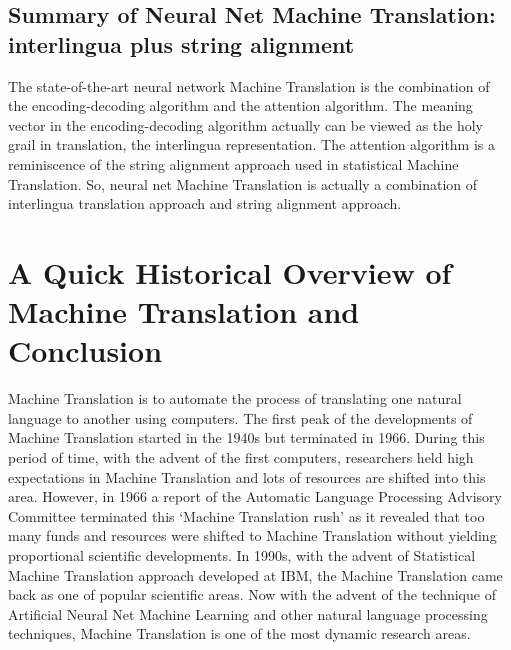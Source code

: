 \subsection{Summary of Neural Net Machine Translation: interlingua plus string alignment}

The state-of-the-art neural network Machine Translation is the combination of the encoding-decoding algorithm and the attention algorithm. The meaning vector in the encoding-decoding algorithm actually can be viewed as the holy grail in translation, the interlingua representation. The attention algorithm is a reminiscence of the string alignment approach used in statistical Machine Translation. So, neural net Machine Translation is actually a combination of interlingua  translation approach and string alignment approach.   


\section{A Quick Historical Overview of Machine Translation and Conclusion}

Machine Translation is to automate the process of translating one natural language to another using computers. The first peak of the developments of Machine Translation started in the 1940s but terminated in 1966. During this period of time, with the advent of the first computers, researchers held high expectations in Machine Translation and lots of resources are shifted into this area. 
However, in 1966 a report of the Automatic Language Processing Advisory Committee \citep{pierce1966language} terminated this `Machine Translation rush' as it revealed that too many funds and resources were shifted to Machine Translation without yielding proportional scientific developments. 
In 1990s, with the advent of Statistical Machine Translation approach developed at IBM, the Machine Translation came back as one of popular scientific areas. 
Now with the advent of the technique of Artificial Neural Net Machine Learning and other natural language processing techniques, Machine Translation is one of the most dynamic research areas.    
